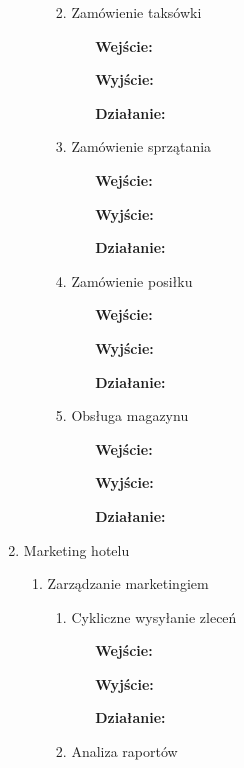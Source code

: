 \documentclass[a4paper, 11pt]{article}
\begin{document}
\begin{enumerate}[label*=\arabic*.]
\begin{enumerate}[label*=\arabic*.]
\begin{enumerate}[label*=\arabic*.]
\begin{itemize}
				\end{itemize}
				\item Zamówienie taksówki
				\begin{itemize}
					\item [\textbf{Wejście:}] 
					\item [\textbf{Wyjście:}]
					\item [\textbf{Działanie:}] 
				\end{itemize}
				\item Zamówienie sprzątania
				\begin{itemize}
					\item [\textbf{Wejście:}] 
					\item [\textbf{Wyjście:}]
					\item [\textbf{Działanie:}] 
				\end{itemize}
				\item Zamówienie posiłku
				\begin{itemize}
					\item [\textbf{Wejście:}] 
					\item [\textbf{Wyjście:}]
					\item [\textbf{Działanie:}] 
				\end{itemize}
				\item Obsługa magazynu
				\begin{itemize}
					\item [\textbf{Wejście:}] 
					\item [\textbf{Wyjście:}]
					\item [\textbf{Działanie:}] 
				\end{itemize}
			\end{enumerate}						
		\end{enumerate}
		\item Marketing hotelu
		\begin{enumerate}[label*=\arabic*.]
			\item Zarządzanie marketingiem
			\begin{enumerate}[label*=\arabic*.]
				\item Cykliczne wysyłanie zleceń
				\begin{itemize}
					\item [\textbf{Wejście:}] 
					\item [\textbf{Wyjście:}]
					\item [\textbf{Działanie:}] 
				\end{itemize}
				\item Analiza raportów
				\begin{itemize}

\end{itemize}
\end{enumerate}
\end{enumerate}
\end{enumerate}
\end{document}
